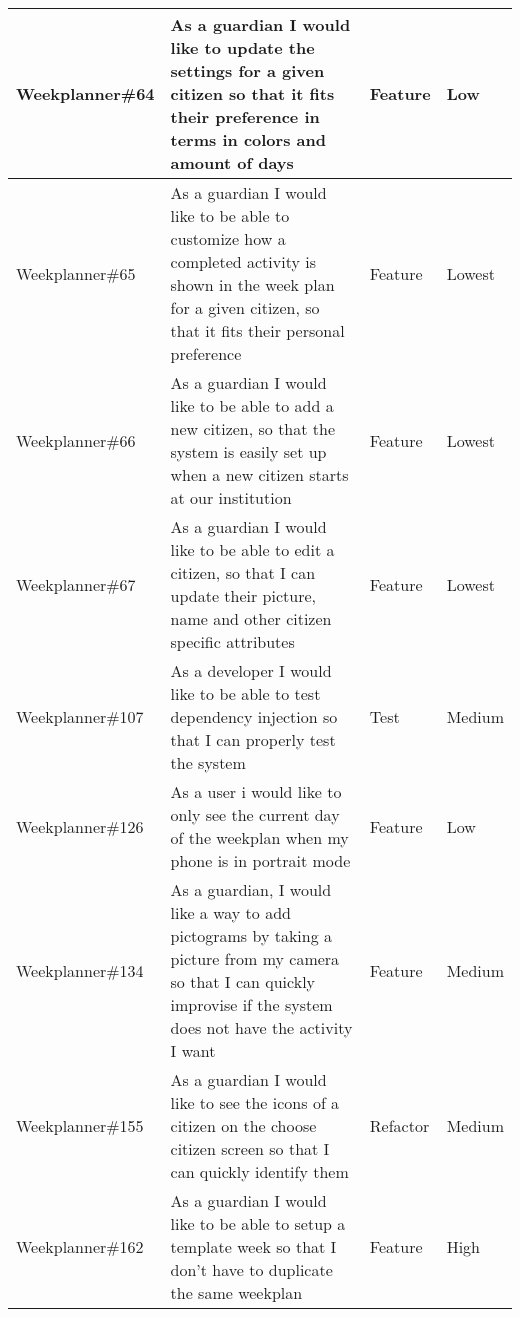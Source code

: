 \begin{longtable}{|p{2.9cm}|p{7cm}|p{1.4cm}|p{1.5cm}|}
    Weekplanner\#64  & As a guardian I would like to update the settings for a given citizen so that it fits their preference in terms in colors and amount of days                              & Feature & Low  \\ \hline
    Weekplanner\#65  & As a guardian I would like to be able to customize how a completed activity is shown in the week plan for a given citizen, so that it fits their personal preference      & Feature & Lowest  \\ \hline
    Weekplanner\#66  & As a guardian I would like to be able to add a new citizen, so that the system is easily set up when a new citizen starts at our institution                              & Feature & Lowest \\ \hline
    Weekplanner\#67  & As a guardian I would like to be able to edit a citizen, so that I can update their picture, name and other citizen specific attributes                                   & Feature & Lowest   \\ \hline
    Weekplanner\#107 & As a developer I would like to be able to test dependency injection so that I can properly test the system                                                                & Test & Medium   \\ \hline
    Weekplanner\#126 & As a user i would like to only see the current day of the weekplan when my phone is in portrait mode                                                                      & Feature & Low   \\ \hline
    Weekplanner\#134 & As a guardian, I would like a way to add pictograms by taking a picture from my camera so that I can quickly improvise if the system does not have the activity I want    & Feature & Medium    \\ \hline
    Weekplanner\#155 & As a guardian I would like to see the icons of a citizen on the choose citizen screen so that I can quickly identify them                                                 & Refactor & Medium   \\ \hline
    Weekplanner\#162 & As a guardian I would like to be able to setup a template week so that I don't have to duplicate the same weekplan                                                        & Feature & High  \\ \hline

\end{longtable}
